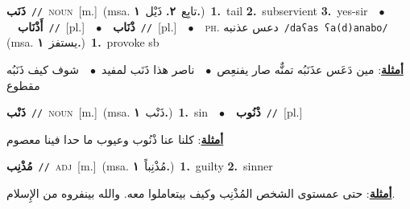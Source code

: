 \documentclass[10pt,a4paper,twoside]{article} %
\begin{document}
\begin{multicols}{2}
{{{{{{{{\setlength\topsep{0pt}\textbf{\foreignlanguage{arabic}{ذَنَب}}\ {\color{gray}\texttt{//}\color{black}}\ \textsc{noun}\ [m.]\ \color{gray}(msa. \foreignlanguage{arabic}{تابِع}~\foreignlanguage{arabic}{\textbf{٢.}}  \foreignlanguage{arabic}{ذَيْل}~\foreignlanguage{arabic}{\textbf{١.}})\color{black}\ \textbf{1.}~tail  \textbf{2.}~subservient  \textbf{3.}~yes-sir\ \ $\bullet$\ \ \setlength\topsep{0pt}\textbf{\foreignlanguage{arabic}{أَذْنَاب}}\ {\color{gray}\texttt{//}\color{black}}\ [pl.]\ \ $\bullet$\ \ \setlength\topsep{0pt}\textbf{\foreignlanguage{arabic}{ذْنَاب}}\ {\color{gray}\texttt{//}\color{black}}\ [pl.]\ \ $\bullet$\ \ \textsc{ph.} \color{gray} \foreignlanguage{arabic}{دعس عذنبه}\color{black}\ {\color{gray}\texttt{/{\sffamily daʕas ʕa(d)anabo}/}\color{black}}\ \color{gray} (msa. \foreignlanguage{arabic}{يستفز}~\foreignlanguage{arabic}{\textbf{١.}})\color{black}\ \textbf{1.}~provoke sb\  \begin{flushright}\color{gray}\foreignlanguage{arabic}{\textbf{\underline{\foreignlanguage{arabic}{أمثلة}}}: مين دَعَس عذَنَبُه تمنٌّه صار يفنعِص\ $\bullet$\ \  ناصر هذا ذَنَب لمفيد\ $\bullet$\ \  شوف كيف ذَنَبُه مقطوع}\end{flushright}\color{black}} \vspace{2mm}

{\setlength\topsep{0pt}\textbf{\foreignlanguage{arabic}{ذَنْب}}\ {\color{gray}\texttt{//}\color{black}}\ \textsc{noun}\ [m.]\ \color{gray}(msa. \foreignlanguage{arabic}{ذَنْب}~\foreignlanguage{arabic}{\textbf{١.}})\color{black}\ \textbf{1.}~sin\ \ $\bullet$\ \ \setlength\topsep{0pt}\textbf{\foreignlanguage{arabic}{ذْنُوب}}\ {\color{gray}\texttt{//}\color{black}}\ [pl.]\  \begin{flushright}\color{gray}\foreignlanguage{arabic}{\textbf{\underline{\foreignlanguage{arabic}{أمثلة}}}: كلنا عنا ذْنُوب وعيوب ما حدا فينا معصوم}\end{flushright}\color{black}} \vspace{2mm}

{\setlength\topsep{0pt}\textbf{\foreignlanguage{arabic}{مُذْنِب}}\ {\color{gray}\texttt{//}\color{black}}\ \textsc{adj}\ [m.]\ \color{gray}(msa. \foreignlanguage{arabic}{مُذْنِباً}~\foreignlanguage{arabic}{\textbf{١.}})\color{black}\ \textbf{1.}~guilty  \textbf{2.}~sinner\  \begin{flushright}\color{gray}\foreignlanguage{arabic}{\textbf{\underline{\foreignlanguage{arabic}{أمثلة}}}: حتى عمستوى الشخص المُذْنِب وكيف بيتعاملوا معه. والله بينفروه من الإِسلام.}\end{flushright}\color{black}} \vspace{2mm}

}}}}}}}
\end{multicols}
\end{document}

